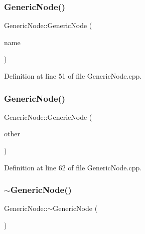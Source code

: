 \subsubsection{\texorpdfstring{Generic\+Node()}{GenericNode()}\hspace{0.1cm}{\footnotesize\ttfamily [1/2]}}
{\footnotesize\ttfamily Generic\+Node\+::\+Generic\+Node (\begin{DoxyParamCaption}\item[{const std\+::string \&}]{name }\end{DoxyParamCaption})\hspace{0.3cm}{\ttfamily [protected]}}



Definition at line 51 of file Generic\+Node.\+cpp.

\mbox{\label{class_generic_node_a9b0f3cb66385b487944d4f28069546f3}} 
\subsubsection{\texorpdfstring{Generic\+Node()}{GenericNode()}\hspace{0.1cm}{\footnotesize\ttfamily [2/2]}}
{\footnotesize\ttfamily Generic\+Node\+::\+Generic\+Node (\begin{DoxyParamCaption}\item[{const \hyperlink{class_generic_node}{Generic\+Node} \&}]{other }\end{DoxyParamCaption})\hspace{0.3cm}{\ttfamily [protected]}}



Definition at line 62 of file Generic\+Node.\+cpp.

\mbox{\label{class_generic_node_ae97c1f46c781cbf09bfa7054097baa2a}} 
\subsubsection{\texorpdfstring{$\sim$\+Generic\+Node()}{~GenericNode()}}
{\footnotesize\ttfamily Generic\+Node\+::$\sim$\+Generic\+Node (\begin{DoxyParamCaption}{ }\end{DoxyParamCaption})\hspace{0.3cm}{\ttfamily [protected]}}




